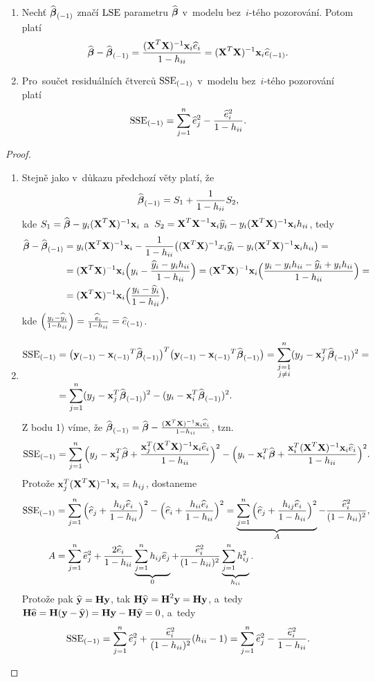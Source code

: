 \begin{theorem}
	\begin{enumerate}[1)]
		\item Nechť $\mini{\wbetab}$ značí $\LSE$ parametru $\wbetab$ v~modelu bez~$i$-tého pozorování. Potom platí
	 $$ \wbetab-\mini{\wbetab} = \frac{(\textbf{X}^T\textbf{X})^{-1}\x_i\hei}{1-\hii} = (\textbf{X}^T\textbf{X})^{-1}\x_i\mini{\he}. $$
	\item Pro~součet residuálních čtverců $\mini{\SSE}$ v~modelu bez~$i$-tého pozorování platí
	 $$ \mini{\SSE} = \sumjn \he_j^2-\frac{\he_i^2}{1-\hii}. $$
	\end{enumerate}

\begin{proof}
	\begin{enumerate}[1)]
		\item Stejně jako v~důkazu předchozí věty platí, že
		 $$ \mini{\wbetab} = S_1+\frac{1}{1-\hii}S_2, $$
		kde $S_1 = \wbetab-y_i\inv{(\textbf{X}^T\textbf{X})}\x_i$ a~$S_2 = \inv{\textbf{X}^T\textbf{X}}\x_i\hyi-y_i\core \x_i\hii$, tedy
		\[
		\begin{split}
		\wbetab-\mini{\wbetab}& = y_i\core\x_i-\frac{1}{1-\hii}\big(\core x_i\hyi-y_i\core \x_i\hii\big) = \\& = \core \x_i\Big(y_i-\frac{\hyi-y_i\hii}{1-\hii}\Big) = \core \x_i\Big(\frac{y_i-y_i\hii-\hyi+y_i\hii}{1-\hii}\Big) = \\& = \core \x_i\Big(\frac{y_i-\hyi}{1-\hii}\Big),
		\end{split}
		\]
		kde $\Big(\frac{y_i-\hyi}{1-\hii}\Big) = \frac{\hei}{1-\hii} = \mini{\he}$.
		\item \[
		\begin{split}
		\mini{\SSE}& = \big(\mini{\y}-\mini{\x}^T\mini{\wbetab}\big)^T\big(\mini{\y}-\mini{\x}^T\mini{\wbetab}\big) = \sum_{\substack{j = 1\\j\neq i}}^n(y_j-\x_j^T\mini{\wbetab})^2 = \\& = \sumjn (y_j-\x_j^T\mini{\wbetab})^2-(y_i-\x_i^T\mini{\wbetab})^2.
		\end{split}
		\]
		Z bodu 1) víme, že $\mini{\wbetab} = \wbetab-\frac{\core \x_i\hei}{1-\hii}$, tzn.
		 $$ \mini{\SSE} = \sumjn\Big(y_j-\x_j^T\wbetab+\frac{\x_j^T\core \x_i\hei}{1-\hii}\Big)^2-\Big(y_i-\x_i^T\wbetab+\frac{\x_i^T\core \x_i\hei}{1-\hii}\Big)^2. $$
		Protože $\x_j^T\core \x_i = h_{ij}$, dostaneme
		\[
	\begin{split}
	\mini{\SSE}& = \sumjn \Big(\he_j+\frac{h_{ij}\hei}{1-\hii}\Big)^2-\Big(\he_i+\frac{h_{ii}\hei}{1-\hii}\Big)^2 = \underbrace{\sumjn\Big(\he_j+\frac{h_{ij}\hei}{1-\hii}\Big)^2}_A-\frac{\hei^2}{(1-\hii)^2},\\
	A& = \sumjn \he_j^2+\frac{2\hei}{1-\hii}\underbrace{\sumjn h_{ij}\he_j}_0+\frac{\hei^2}{(1-\hii)^2}\underbrace{\sumjn h_{ij}^2}_{\hii}.
	\end{split}
	\]
		Protože pak $\hyb = \Hm\y$, tak $\Hm\hyb = \Hm^2\y = \Hm\y$, a~tedy $\Hm\heb = \Hm(\y-\hyb) = \Hm\y-\Hm\hyb = 0$, a~tedy
		 $$ \mini{\SSE} = \sumjn\he_j^2+\frac{\hei^2}{(1-\hii)^2}(\hii-1) = \sumjn\he_j^2-\frac{\hei^2}{1-\hii}. $$
	\end{enumerate}
\end{proof}
\end{theorem}


